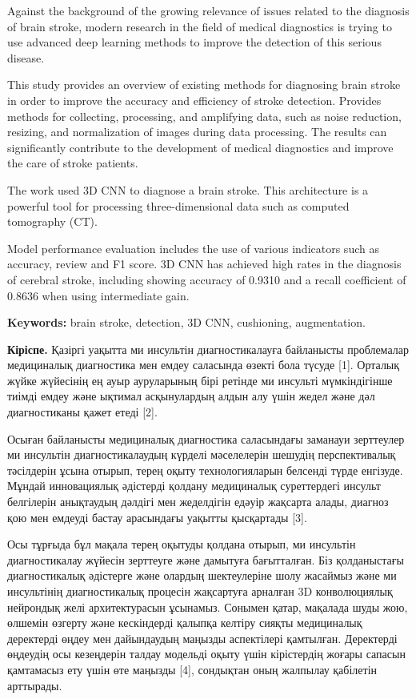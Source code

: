 Against the background of the growing relevance of issues related to the
diagnosis of brain stroke, modern research in the field of medical
diagnostics is trying to use advanced deep learning methods to improve
the detection of this serious disease.

This study provides an overview of existing methods for diagnosing brain
stroke in order to improve the accuracy and efficiency of stroke
detection. Provides methods for collecting, processing, and amplifying
data, such as noise reduction, resizing, and normalization of images
during data processing. The results can significantly contribute to the
development of medical diagnostics and improve the care of stroke
patients.

The work used 3D CNN to diagnose a brain stroke. This architecture is a
powerful tool for processing three-dimensional data such as computed
tomography (CT).

Model performance evaluation includes the use of various indicators such
as accuracy, review and F1 score. 3D CNN has achieved high rates in the
diagnosis of cerebral stroke, including showing accuracy of 0.9310 and a
recall coefficient of 0.8636 when using intermediate gain.

\textbf{Keywords:} brain stroke, detection, 3D CNN, cushioning,
augmentation.

\textbf{Кіріспе.} Қазіргі уақытта ми инсультін диагностикалауға
байланысты проблемалар медициналық диагностика мен емдеу саласында
өзекті бола түсуде {[}1{]}. Орталық жүйке жүйесінің ең ауыр ауруларының
бірі ретінде ми инсульті мүмкіндігінше тиімді емдеу және ықтимал
асқынулардың алдын алу үшін жедел және дәл диагностиканы қажет етеді
{[}2{]}.

Осыған байланысты медициналық диагностика саласындағы заманауи
зерттеулер ми инсультін диагностикалаудың күрделі мәселелерін шешудің
перспективалық тәсілдерін ұсына отырып, терең оқыту технологияларын
белсенді түрде енгізуде. Мұндай инновациялық әдістерді қолдану
медициналық суреттердегі инсульт белгілерін анықтаудың дәлдігі мен
жеделдігін едәуір жақсарта алады, диагноз қою мен емдеуді бастау
арасындағы уақытты қысқартады {[}3{]}.

Осы тұрғыда бұл мақала терең оқытуды қолдана отырып, ми инсультін
диагностикалау жүйесін зерттеуге және дамытуға бағытталған. Біз
қолданыстағы диагностикалық әдістерге және олардың шектеулеріне шолу
жасаймыз және ми инсультінің диагностикалық процесін жақсартуға арналған
3D конволюциялық нейрондық желі архитектурасын ұсынамыз. Сонымен қатар,
мақалада шуды жою, өлшемін өзгерту және кескіндерді қалыпқа келтіру
сияқты медициналық деректерді өңдеу мен дайындаудың маңызды аспектілері
қамтылған. Деректерді өңдеудің осы кезеңдерін талдау модельді оқыту үшін
кірістердің жоғары сапасын қамтамасыз ету үшін өте маңызды {[}4{]},
сондықтан оның жалпылау қабілетін арттырады.

